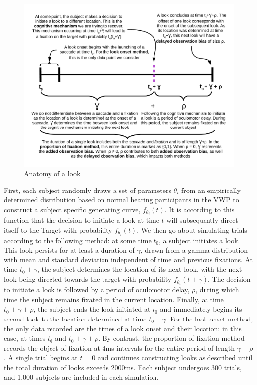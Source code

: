 \documentclass{article}
\begin{document}
\begin{figure}[H]
\centering
\includegraphics[width=\textwidth]{anatomy_of_look.pdf}
\caption{Anatomy of a look}
\label{fig:anatomy_of_look}
\end{figure}


First, each subject randomly draws a set of parameters $\theta_i$ from an empirically determined distribution based on normal hearing participants in the VWP \cite{FarrisTrimble2014} to construct a subject specific generating curve, $f_{\theta_i}(t)$.   It is according to this function that the decision to initiate a look at time $t$ will subsequently direct itself to the Target with probability $f_{\theta_i}(t)$. We then go about simulating trials according to the following method: at some time $t_0$, a subject initiates a look. This look persists for at least a duration of $\gamma$, drawn from a gamma distribution with mean and standard deviation independent of time and previous fixations. At time $t_0+\gamma$, the subject determines the location of its next look, with the next look being directed towards the target with probability $f_{\theta_i}(t+\gamma)$. The decision to initiate a look is followed by a period of oculomotor delay, $\rho$, during which time the subject remains fixated in the current location. Finally, at time $t_0 + \gamma + \rho$, the subject ends the look initiated at $t_0$ and immediately begins its second look to the location determined at time $t_0 + \gamma$. For the look onset method, the only data recorded are the times of a look onset and their location: in this case, at times $t_0$ and $t_0 + \gamma + \rho$. By contrast, the proportion of fixation method records the object of fixation at 4ms intervals for the entire period of length $\gamma + \rho$. A single trial begins at $t = 0$ and continues constructing looks as described until the total duration of looks exceeds 2000ms. Each subject undergoes 300 trials, and 1,000 subjects are included in each simulation.
\end{document}
